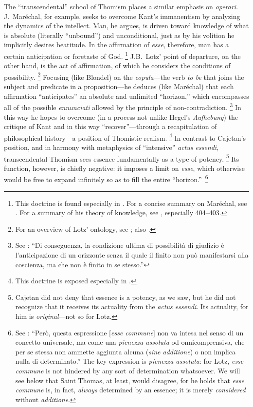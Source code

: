 The “transcendental” school of Thomism places a similar emphasis on \emph{operari}. J.~Maréchal, for example, seeks to overcome Kant’s immanentism by analyzing the dynamics of the intellect. Man, he argues, is driven toward knowledge of what is absolute (literally “unbound”) and unconditional, just as by his volition he implicitly desires beatitude. In the affirmation of \emph{esse}, therefore, man has a certain anticipation or foretaste of God.%
%
\footnote{This doctrine is found especially in \cite{marechal:cahier05}. For a concise summary on Maréchal, see \cite[265–269]{copleston:history:09}. For a summary of his theory of knowledge, see \cite{daros:apriori}, especially 404–403. }
%
J.B.~Lotz’ point of departure, on the other hand, is the act of affirmation, of which he considers the conditions of possibility.%
%
\footnote{For an overview of Lotz’ ontology, see \cite[116–119]{contat:quarta-via}; also \cite[216–229]{contat:confronto}.}
%
Focusing (like Blondel) on the \emph{copula}—the verb \emph{to be} that joins the subject and predicate in a proposition—he deduces (like Maréchal) that each affirmation “anticipates” an absolute and unlimited “horizon,” which encompasses all of the possible \emph{ennunciati} allowed by the principle of non-contradiction.%
%
\footnote{See \cite[117–118]{contat:quarta-via}: “Di conseguenza, la condizione ultima di possibilità di giudizio è l’anticipazione di un orizzonte senza il quale il finito non può manifestarsi alla coscienza, ma che non è finito in se stesso.”}
%
In this way he hopes to overcome (in a process not unlike Hegel’s \emph{Aufhebung}) the critique of Kant and in this way “recover”—through a recapitulation of philosophical history—a position of Thomistic realism.%
%
\footnote{This doctrine is exposed especially in \cite{lotz:esperienza}.}
%
In contrast to Cajetan’s position, and in harmony with metaphysics of “intensive” \emph{actus essendi}, transcendental Thomism sees essence fundamentally as a type of potency.%
%
\footnote{Cajetan did not deny that essence is a potency, as we saw, but he did not recognize that it receives its actuality from the \emph{actus essendi}. Its actuality, for him is \emph{original}—not so for Lotz.}
%
Its function, however, is chiefly negative: it imposes a limit on \emph{esse}, which otherwise would be free to expand infinitely so as to fill the entire “horizon.”\,%
%
\footnote{See \cite[104–105]{lotz:esperienza}: “Però, questa espressione [\emph{esse commune}] non va intesa nel senso di un concetto universale, ma come una \emph{pienezza assoluta} od onnicomprensiva, che per se stessa non ammette aggiunta alcuna (\emph{sine additione}) o non implica nulla di determinato.” The key expression is \emph{pienezza assoluta}: for Lotz, \emph{esse commune} is not hindered by any sort of determination whatsoever. We will see below that Saint Thomas, at least, would disagree, for he holds that \emph{esse commune} is, in fact, \emph{always} determined by an essence; it is merely \emph{considered} without \emph{additione}.}
